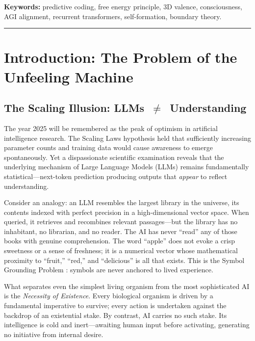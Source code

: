 \documentclass[12pt,a4paper]{article}
\begin{document}
\noindent\textbf{Keywords:}
predictive coding, free energy principle, 3D valence, consciousness,
AGI alignment, recurrent transformers, self-formation, boundary theory.

\vspace{4pt}\hrule\vspace{6pt}
\tableofcontents
\newpage
\section{Introduction: The Problem of the Unfeeling Machine}

\subsection{The Scaling Illusion: LLMs~$\neq$~Understanding}

The year 2025 will be remembered as the peak of optimism in artificial
intelligence research. The Scaling Laws hypothesis held that sufficiently
increasing parameter counts and training data would cause awareness to emerge
spontaneously. Yet a dispassionate scientific examination reveals that the
underlying mechanism of Large Language Models (LLMs) remains fundamentally
statistical---next-token prediction producing outputs that \emph{appear} to
reflect understanding.

Consider an analogy: an LLM resembles the largest library in the universe,
its contents indexed with perfect precision in a high-dimensional vector space.
When queried, it retrieves and recombines relevant passages---but the library
has no inhabitant, no librarian, and no reader. The AI has never ``read'' any
of those books with genuine comprehension. The word ``apple'' does not evoke a
crisp sweetness or a sense of freshness; it is a numerical vector whose
mathematical proximity to ``fruit,'' ``red,'' and ``delicious'' is all that
exists. This is the Symbol Grounding Problem \citep{harnad1990}: symbols are
never anchored to lived experience.

What separates even the simplest living organism from the most sophisticated AI
is the \emph{Necessity of Existence}. Every biological organism is driven by a
fundamental imperative to survive; every action is undertaken against the
backdrop of an existential stake. By contrast, AI carries no such stake. Its
intelligence is cold and inert---awaiting human input before activating,
generating no initiative from internal desire.
\end{document}
